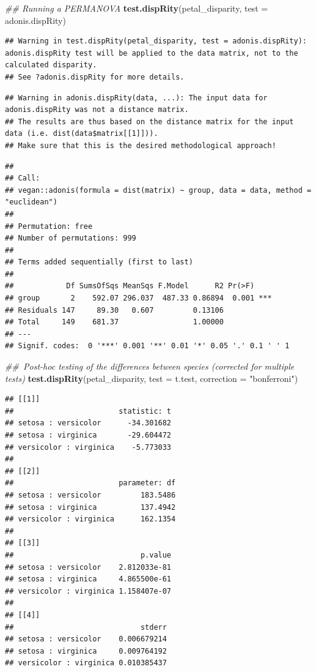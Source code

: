 \documentclass[]{book}
\newenvironment{Shaded}{\begin{snugshade}}{\end{snugshade}}
\newcommand{\CommentTok}[1]{\textcolor[rgb]{0.56,0.35,0.01}{\textit{#1}}}
\newcommand{\DataTypeTok}[1]{\textcolor[rgb]{0.13,0.29,0.53}{#1}}
\newcommand{\KeywordTok}[1]{\textcolor[rgb]{0.13,0.29,0.53}{\textbf{#1}}}
\newcommand{\NormalTok}[1]{#1}
\newcommand{\StringTok}[1]{\textcolor[rgb]{0.31,0.60,0.02}{#1}}
\begin{document}
\begin{Shaded}
\begin{Highlighting}[]
\CommentTok{## Running a PERMANOVA}
\KeywordTok{test.dispRity}\NormalTok{(petal_disparity, }\DataTypeTok{test =}\NormalTok{ adonis.dispRity)}
\end{Highlighting}
\end{Shaded}

\begin{verbatim}
## Warning in test.dispRity(petal_disparity, test = adonis.dispRity): adonis.dispRity test will be applied to the data matrix, not to the calculated disparity.
## See ?adonis.dispRity for more details.
\end{verbatim}

\begin{verbatim}
## Warning in adonis.dispRity(data, ...): The input data for adonis.dispRity was not a distance matrix.
## The results are thus based on the distance matrix for the input data (i.e. dist(data$matrix[[1]])).
## Make sure that this is the desired methodological approach!
\end{verbatim}

\begin{verbatim}
## 
## Call:
## vegan::adonis(formula = dist(matrix) ~ group, data = data, method = "euclidean") 
## 
## Permutation: free
## Number of permutations: 999
## 
## Terms added sequentially (first to last)
## 
##            Df SumsOfSqs MeanSqs F.Model      R2 Pr(>F)    
## group       2    592.07 296.037  487.33 0.86894  0.001 ***
## Residuals 147     89.30   0.607         0.13106           
## Total     149    681.37                 1.00000           
## ---
## Signif. codes:  0 '***' 0.001 '**' 0.01 '*' 0.05 '.' 0.1 ' ' 1
\end{verbatim}

\begin{Shaded}
\begin{Highlighting}[]
\CommentTok{## Post-hoc testing of the differences between species (corrected for multiple tests)}
\KeywordTok{test.dispRity}\NormalTok{(petal_disparity, }\DataTypeTok{test =}\NormalTok{ t.test, }\DataTypeTok{correction =} \StringTok{"bonferroni"}\NormalTok{)}
\end{Highlighting}
\end{Shaded}

\begin{verbatim}
## [[1]]
##                        statistic: t
## setosa : versicolor      -34.301682
## setosa : virginica       -29.604472
## versicolor : virginica    -5.773033
## 
## [[2]]
##                        parameter: df
## setosa : versicolor         183.5486
## setosa : virginica          137.4942
## versicolor : virginica      162.1354
## 
## [[3]]
##                             p.value
## setosa : versicolor    2.812033e-81
## setosa : virginica     4.865500e-61
## versicolor : virginica 1.158407e-07
## 
## [[4]]
##                             stderr
## setosa : versicolor    0.006679214
## setosa : virginica     0.009764192
## versicolor : virginica 0.010385437
\end{verbatim}
\end{document}
